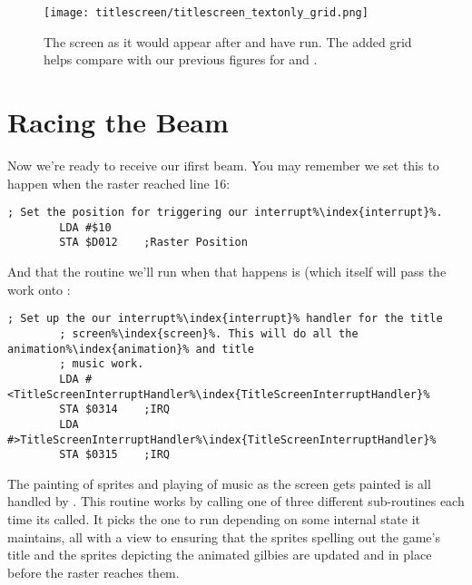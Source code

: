\begin{figure}[H]
    \begin{adjustbox}{width=13cm,center}
    \texttt{[image: titlescreen/titlescreen\_textonly\_grid.png]}%
    \end{adjustbox}
  \caption{The screen as it would appear after  and  have run. The added
  grid helps compare with our previous figures for  and .}
\end{figure}

\section{Racing the Beam}
Now we're ready to receive our ifirst beam. You may remember we set this to happen when the raster reached line 16:

\begin{lstlisting}[caption=In \icode{InitializeSpritesAndInterruptsForTitleScreen\index{InitializeSpritesAndInterruptsForTitleScreen}},escapechar=\%]
        ; Set the position for triggering our interrupt%\index{interrupt}%.
        LDA #$10
        STA $D012    ;Raster Position
\end{lstlisting}

And that the routine we'll run when that happens is  (which itself will pass
the work onto :

\begin{lstlisting}[caption=In \icode{InitializeSpritesAndInterruptsForTitleScreen\index{InitializeSpritesAndInterruptsForTitleScreen}},escapechar=\%]
        ; Set up the our interrupt%\index{interrupt}% handler for the title
        ; screen%\index{screen}%. This will do all the animation%\index{animation}% and title
        ; music work.
        LDA #<TitleScreenInterruptHandler%\index{TitleScreenInterruptHandler}%
        STA $0314    ;IRQ
        LDA #>TitleScreenInterruptHandler%\index{TitleScreenInterruptHandler}%
        STA $0315    ;IRQ
\end{lstlisting}

The painting of sprites and playing of music as the screen gets painted is all handled by .
This routine works by calling one of three different sub-routines each time its called. It picks the one to run
depending on some internal state it maintains, all with a view to ensuring that the sprites spelling out the game's
title and the sprites depicting the animated gilbies are updated and in place before the raster reaches them.

